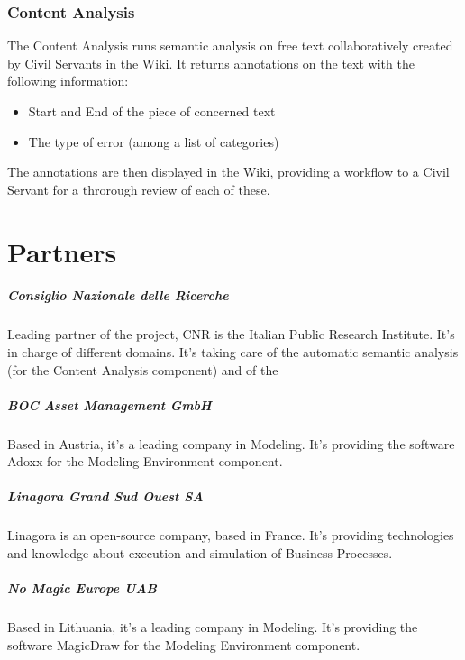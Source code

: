 \documentclass{learnpad}
\begin{document}
\subsection{Content Analysis}
The Content Analysis runs semantic analysis on free text collaboratively created
by Civil Servants in the Wiki.  It returns annotations on the text with the
following information:
\begin{itemize}
	\item Start and End of the piece of concerned text
	\item The type of error (among a list of categories)
\end{itemize}

The annotations are then displayed in the Wiki, providing a workflow to a Civil
Servant for a throrough review of each of these.

\chapter{Partners}
\label{ch:partners}

\paragraph{Consiglio Nazionale delle Ricerche}
Leading partner of the \learnpad project, CNR is the Italian Public Research
Institute.  It's in charge of different domains.  It's taking care of the
automatic semantic analysis (for the Content Analysis component) and of the 

\paragraph{BOC Asset Management GmbH}
Based in Austria, it's a leading company in Modeling.  It's providing the
software Adoxx for the Modeling Environment component.

\paragraph{Linagora Grand Sud Ouest SA}
Linagora is an open-source company, based in France.  It's providing
technologies and knowledge about execution and simulation of Business Processes.

\paragraph{No Magic Europe UAB}
Based in Lithuania, it's a leading company in Modeling.  It's providing the
software MagicDraw for the Modeling Environment component.
\end{document}
